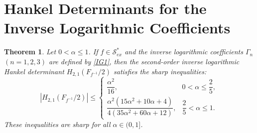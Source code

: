 \documentclass[11pt,reqno]{amsart}
\newtheorem{theo}{Theorem}[section]
\numberwithin{equation}{section}
\begin{document}
\section{Hankel Determinants for the Inverse Logarithmic Coefficients}

\begin{theo}\label{T3}
Let $0<\alpha\le 1$. If $f\in \mathcal{S}_{ex}^{\ast}$ and the inverse logarithmic coefficients $\Gamma_n$ $(n=1,2,3)$ are defined by \eqref{IG1}, then the second-order inverse logarithmic Hankel determinant $H_{2,1}(F_{f^{-1}}/2)$ satisfies the sharp inequalities:
\begin{equation}\label{ND18}
\left| H_{2,1}\left(F_{f^{-1}}/2\right)\right| \le
\begin{cases}
\dfrac{\alpha^2}{16}, & 0<\alpha\le \dfrac25,\\[8pt]
\dfrac{\alpha^2(15\alpha^2+10\alpha+4)}{4(35\alpha^2+60\alpha+12)}, & \dfrac25<\alpha\le 1.
\end{cases}
\end{equation}
These inequalities are sharp for all $\alpha\in(0,1]$.
\end{theo}
\end{document}
